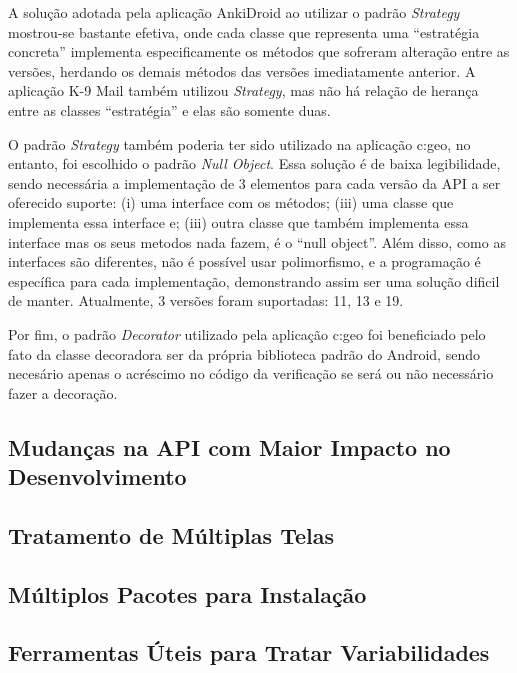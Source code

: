 A solução adotada pela aplicação AnkiDroid ao utilizar o padrão \textit{Strategy}
mostrou-se bastante efetiva, onde cada classe  que representa uma “estratégia concreta”
implementa especificamente os métodos que sofreram alteração entre as versões,
herdando os demais métodos das versões imediatamente anterior.
A aplicação K-9 Mail também utilizou \textit{Strategy}, mas não há relação de
herança entre as classes “estratégia” e elas são somente duas.

O padrão \textit{Strategy} também poderia ter sido utilizado na aplicação c:geo,
no entanto, foi escolhido o padrão \textit{Null Object}. Essa solução é de baixa
legibilidade, sendo necessária a implementação de 3 elementos para cada versão da
API a ser oferecido suporte: (i) uma interface com os métodos; (iii) uma classe
que implementa essa interface e; (iii) outra classe que também implementa essa interface
mas os seus metodos nada fazem, é o “null object”.
Além disso, como as interfaces são diferentes, não é possível usar polimorfismo,
e a programação é específica para cada implementação, demonstrando assim ser uma
solução dificil de manter. Atualmente, 3 versões foram suportadas: 11, 13 e 19.

Por fim, o padrão \textit{Decorator} utilizado pela aplicação c:geo foi beneficiado
pelo fato da classe decoradora ser da própria biblioteca padrão do Android,
sendo necesário apenas o acréscimo no código da verificação se será ou não
necessário fazer a decoração.

\subsection{Mudanças na API com Maior Impacto no Desenvolvimento}
\label{sec:mudancas}

\subsection{Tratamento de  Múltiplas Telas}
\label{sec:multiplas_telas}

\subsection{Múltiplos Pacotes para Instalação}
\label{sec:multiplos_pacotes}

\subsection{Ferramentas Úteis para Tratar Variabilidades}
\label{sec:ferramentas}


